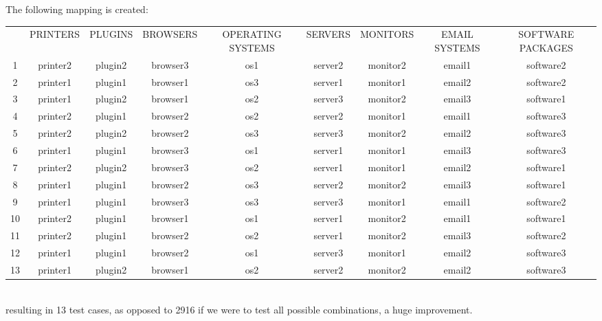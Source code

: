 \documentclass[letterpaper]{article}
\begin{document}
The following mapping is created:
\vspace{20pt}
\begin{adjustbox}{max width=1.5\textwidth, center}
	\begin{tabular}{ccccccccc}
		   & PRINTERS & PLUGINS & BROWSERS & OPERATING SYSTEMS & SERVERS & MONITORS & EMAIL SYSTEMS & SOFTWARE PACKAGES \\
		1  & printer2 & plugin2 & browser3 & os1               & server2 & monitor2 & email1        & software2         \\
		2  & printer1 & plugin1 & browser1 & os3               & server1 & monitor1 & email2        & software2         \\
		3  & printer1 & plugin2 & browser1 & os2               & server3 & monitor2 & email3        & software1         \\
		4  & printer2 & plugin1 & browser2 & os2               & server2 & monitor1 & email1        & software3         \\
		5  & printer2 & plugin2 & browser2 & os3               & server3 & monitor2 & email2        & software3         \\
		6  & printer1 & plugin1 & browser3 & os1               & server1 & monitor1 & email3        & software3         \\
		7  & printer2 & plugin2 & browser3 & os2               & server1 & monitor1 & email2        & software1         \\
		8  & printer1 & plugin1 & browser2 & os3               & server2 & monitor2 & email3        & software1         \\
		9  & printer1 & plugin1 & browser3 & os3               & server3 & monitor1 & email1        & software2         \\
		10 & printer2 & plugin1 & browser1 & os1               & server1 & monitor2 & email1        & software1         \\
		11 & printer2 & plugin1 & browser2 & os2               & server1 & monitor2 & email3        & software2         \\
		12 & printer1 & plugin1 & browser2 & os1               & server3 & monitor1 & email2        & software3         \\
		13 & printer1 & plugin2 & browser1 & os2               & server2 & monitor2 & email2        & software3
	\end{tabular}%
\end{adjustbox}
\\

resulting in 13 test cases, as opposed to 2916 if we were to test all possible
combinations, a huge improvement.
\end{document}

